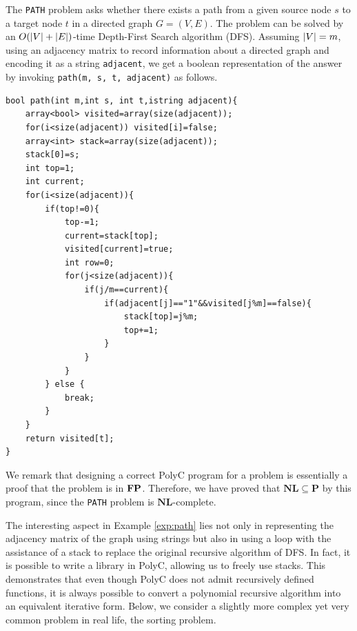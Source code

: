 \documentclass[runningheads]{llncs}
\begin{document}
\begin{example}
\label{exp:path}
The \texttt{PATH} problem asks whether there exists a path from a given source node $s$ to a target node $t$ in a directed graph $G=(V,E)$.
The problem can be solved by an $O(\vert V\vert+\vert E\vert)$-time Depth-First Search algorithm (DFS).
Assuming $\vert V\vert = m$, using an adjacency matrix to record information about a directed graph and encoding it as a string \texttt{adjacent}, we get a boolean representation of the answer by invoking \texttt{path(m, s, t, adjacent)} as follows.
\begin{lstlisting}
bool path(int m,int s, int t,istring adjacent){
    array<bool> visited=array(size(adjacent));
    for(i<size(adjacent)) visited[i]=false;
    array<int> stack=array(size(adjacent));
    stack[0]=s;
    int top=1;
    int current;
    for(i<size(adjacent)){
        if(top!=0){
            top-=1;
            current=stack[top];
            visited[current]=true;
            int row=0;
            for(j<size(adjacent)){
                if(j/m==current){
                    if(adjacent[j]=="1"&&visited[j%m]==false){
                        stack[top]=j%m;
                        top+=1;
                    }
                }
            }
        } else {
            break;
        }
    }
    return visited[t];
}
\end{lstlisting}
We remark that designing a correct PolyC program for a problem is essentially a proof that the problem is in $\mathbf{FP}$.
Therefore, we have proved that $\mathbf{NL}\subseteq\mathbf{P}$ by this program, since the \texttt{PATH} problem is $\mathbf{NL}$-complete.


\end{example}

The interesting aspect in Example \ref{exp:path} lies not only in representing the adjacency matrix of the graph using strings but also in using a loop with the assistance of a stack to replace the original recursive algorithm of DFS.
In fact, it is possible to write a library in PolyC, allowing us to freely use stacks.
This demonstrates that even though PolyC does not admit recursively defined functions, it is always possible to convert a polynomial recursive algorithm into an equivalent iterative form.
Below, we consider a slightly more complex yet very common problem in real life, the sorting problem.
\end{document}
